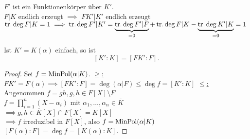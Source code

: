 \begin{bemerkungnr}
    $F'$ ist ein Funktionenkörper über $K'$.\\
    $F|K$ endlich erzeugt $\implies$ $FK'|K'$ endlich erzeugt\\
    $\operatorname{tr.deg} F|K = 1 \implies \operatorname{tr.deg} F'|K' = \underbrace{\operatorname{tr.deg} F'|F}_{=0} + \operatorname{tr.deg} F|K - 
    \underbrace{\operatorname{tr.deg} K'|K}_{=0} = 1$
\end{bemerkungnr}

\begin{lemma}
    Ist $K'=K(\alpha)$ einfach, so ist
    $$ [K':K] = [FK':F]. $$
\end{lemma}
\begin{proof}
    Sei $f=\operatorname{MinPol}(\alpha|K)$.\nl
    \underline{$\geq$:} $FK' = F(\alpha) \implies [FK':F] = \deg (\alpha|F) \leq \deg f = [K':K]$\nl
    \underline{$\leq$:} Angenommen $f=gh, g,h \in F[X]\setminus F$\\
    $f = \prod\limits_{i=1}^n (X-\alpha_i)$ mit $\alpha_1,\ldots,\alpha_n \in \overline{K}$\\
    $\implies g,h \in \overline{K}[X]\cap F[X] = K[X]$ \Lightning\\
    $ \implies f$ irreduzibel in $F[X]$, also $f=\operatorname{MinPol}(\alpha|K)$\\
    $[F(\alpha):F] = \deg f = [K(\alpha):K]$.
\end{proof}

